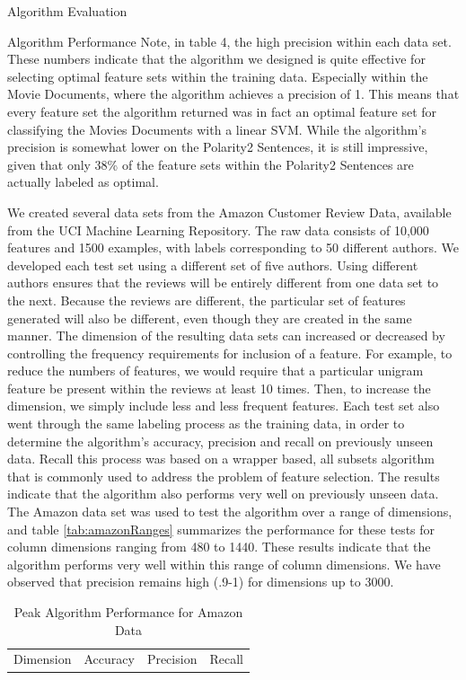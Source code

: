 \documentclass{llncs}
\begin{document}
\begin{section}{Algorithm Evaluation}
\begin{subsection}{Algorithm Performance}
Note, in table 4, the high precision within each data set. These numbers indicate that the algorithm we designed is quite effective for selecting optimal feature sets within the training data. Especially within the Movie Documents, where the algorithm achieves a precision of 1. This means that every feature set the algorithm returned was in fact an optimal feature set for classifying the Movies Documents with a linear SVM. While the algorithm's precision is somewhat lower on the Polarity2 Sentences, it is still impressive, given that only 38\% of the feature sets within the Polarity2 Sentences are actually labeled as optimal.


We created several data sets from the Amazon Customer Review Data, available from the UCI Machine Learning Repository\cite{UCI}. The raw data consists of 10,000 features and 1500 examples, with labels corresponding to 50 different authors. We developed each test set using a different set of five authors. Using different authors ensures that the reviews will be entirely different from one data set to the next. Because the reviews are different, the particular set of features generated will also be different, even though they are created in the same manner. The dimension of the  resulting data sets can increased or decreased by controlling the frequency requirements for inclusion of a feature. For example, to reduce the numbers of features, we would require that a particular unigram feature be present within the reviews at least 10 times. Then, to increase the dimension, we simply include less and less frequent features. Each test set also went through the same labeling process as the training data, in order to determine the algorithm's accuracy, precision and recall on previously unseen data. Recall this process was based on a wrapper based, all subsets algorithm that is commonly used to address the problem of feature selection. The results indicate that the algorithm also performs very well on previously unseen data. The Amazon data set was used to test the algorithm over a range of dimensions, and table \ref{tab:amazonRanges} summarizes the performance for these tests for column dimensions ranging from 480 to 1440. These results indicate that the algorithm performs very well within this range of column dimensions. We have observed that precision remains high (.9-1) for dimensions up to 3000.
\begin{table}[ht]
\centering
\caption{Peak Algorithm Performance for Amazon Data}
\begin{tabular}{l l l l}
\hline \hline
Dimension& Accuracy &Precision&  Recall\\

\end{tabular}
\end{table}
\end{subsection}
\end{section}
\end{document}
